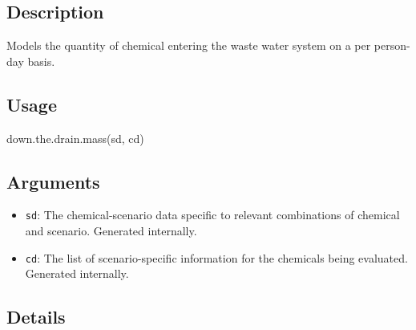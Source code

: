 \documentclass[
]{article}
\newenvironment{Shaded}{\begin{snugshade}}{\end{snugshade}}
\newcommand{\FunctionTok}[1]{\textcolor[rgb]{0.00,0.00,0.00}{#1}}
\newcommand{\NormalTok}[1]{#1}
\providecommand{\tightlist}{%
  \setlength{\itemsep}{0pt}\setlength{\parskip}{0pt}}
\begin{document}
\hypertarget{description-18}{%
\subsection{Description}\label{description-18}}

Models the quantity of chemical entering the waste water system on a per
person-day basis.

\hypertarget{usage-18}{%
\subsection{Usage}\label{usage-18}}

\begin{Shaded}
\begin{Highlighting}[]
\FunctionTok{down.the.drain.mass}\NormalTok{(sd, cd)}
\end{Highlighting}
\end{Shaded}

\hypertarget{arguments-15}{%
\subsection{Arguments}\label{arguments-15}}

\begin{itemize}
\tightlist
\item
  \texttt{sd}: The chemical-scenario data specific to relevant
  combinations of chemical and scenario. Generated internally.
\item
  \texttt{cd}: The list of scenario-specific information for the
  chemicals being evaluated. Generated internally.
\end{itemize}

\hypertarget{details-13}{%
\subsection{Details}\label{details-13}}
\end{document}
